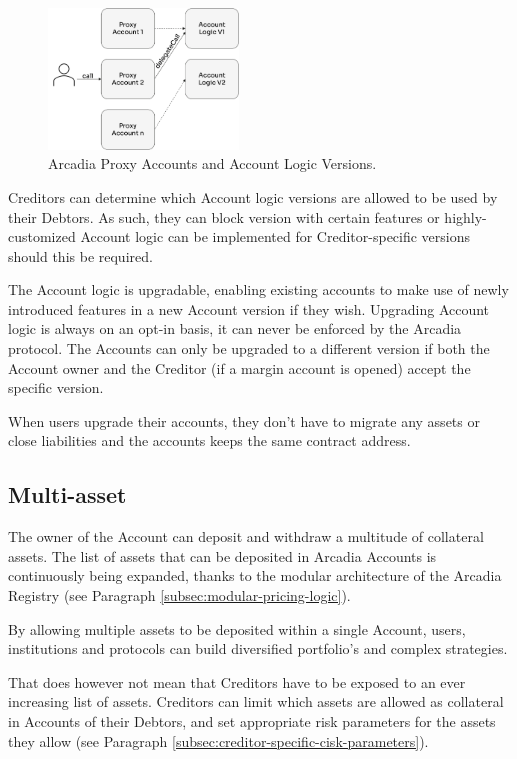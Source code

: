 \documentclass[sigconf,nonacm]{acmart}
\begin{document}
\begin{figure}
    \centering
    \includegraphics[width=0.45\textwidth]{images/Proxy-Accounts.png}
    \caption{Arcadia Proxy Accounts and Account Logic Versions. \label{fig:proxy-accounts}}
\end{figure}

Creditors can determine which Account logic versions are allowed to be used by their Debtors.
As such, they can block version with certain features or highly-customized Account logic can be implemented for Creditor-specific versions should this be required.

The Account logic is upgradable, enabling existing accounts to make use of newly introduced features in a new Account version if they wish.
Upgrading Account logic is always on an opt-in basis, it can never be enforced by the Arcadia protocol.
The Accounts can only be upgraded to a different version if both the Account owner and the Creditor (if a margin account is opened) accept the specific version.

When users upgrade their accounts, they don't have to migrate any assets or close liabilities and the accounts keeps the same contract address.

\subsection{Multi-asset}
\label{subsec:multi-asset}
The owner of the Account can deposit and withdraw a multitude of collateral assets.
The list of assets that can be deposited in Arcadia Accounts is continuously being expanded, thanks to the modular architecture of the Arcadia Registry (see Paragraph \ref{subsec:modular-pricing-logic}).

By allowing multiple assets to be deposited within a single Account, users, institutions and protocols can build diversified portfolio's and complex strategies.

That does however not mean that Creditors have to be exposed to an ever increasing list of assets.
Creditors can limit which assets are allowed as collateral in Accounts of their Debtors,
and set appropriate risk parameters for the assets they allow (see Paragraph \ref{subsec:creditor-specific-cisk-parameters}).
\end{document}
